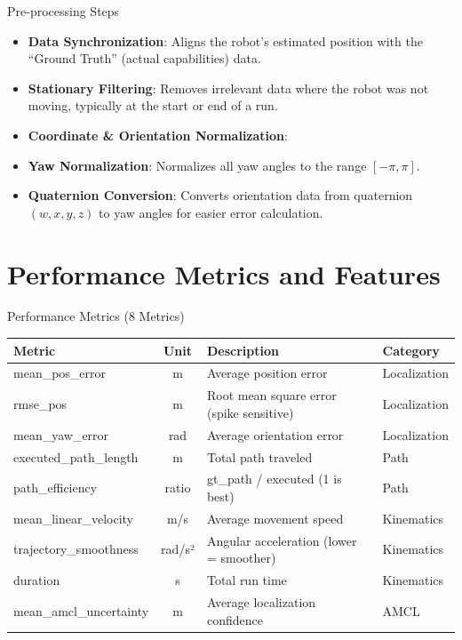 \documentclass[aspectratio=169, 11pt]{beamer}
\begin{document}
\begin{frame}{Pre-processing Steps}
  \begin{itemize}
    \item \textbf{Data Synchronization}: Aligns the robot's estimated position with the ``Ground Truth'' (actual capabilities) data.
    \vspace{0.2cm}
    \item \textbf{Stationary Filtering}: Removes irrelevant data where the robot was not moving, typically at the start or end of a run.
    \vspace{0.2cm}
    \item \textbf{Coordinate \& Orientation Normalization}:
    \vspace{0.2cm}
    \item \textbf{Yaw Normalization}: Normalizes all yaw angles to the range $[-\pi, \pi]$.
    \vspace{0.2cm}
    \item \textbf{Quaternion Conversion}: Converts orientation data from quaternion $(w,x,y,z)$ to yaw angles for easier error calculation.
  \end{itemize}
\end{frame}

\section{Performance Metrics and Features}

\begin{frame}{Performance Metrics (8 Metrics)}
  \begin{table}
    \footnotesize
    \renewcommand{\arraystretch}{1.2}
    \begin{tabular}{@{}L{3.8cm} c L{4.5cm} L{2.2cm}@{}}
      \toprule
      \textbf{Metric} & \textbf{Unit} & \textbf{Description} & \textbf{Category} \\
      \midrule
      mean\_pos\_error & m & Average position error & Localization \\
      rmse\_pos & m & Root mean square error (spike sensitive) & Localization \\
      mean\_yaw\_error & rad & Average orientation error & Localization \\
      executed\_path\_length & m & Total path traveled & Path \\
      path\_efficiency & ratio & gt\_path / executed (1 is best) & Path \\
      mean\_linear\_velocity & m/s & Average movement speed & Kinematics \\
      trajectory\_smoothness & rad/s² & Angular acceleration (lower = smoother) & Kinematics \\
      duration & s & Total run time & Kinematics \\
      mean\_amcl\_uncertainty & m & Average localization confidence & AMCL \\
      \bottomrule
    \end{tabular}
  \end{table}
\end{frame}
\end{document}
